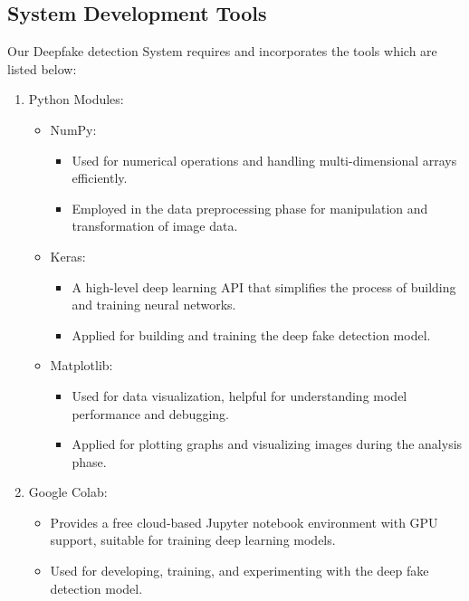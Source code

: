 \subsection{System Development Tools}
Our Deepfake detection System requires and incorporates the tools which are listed below:
\begin{enumerate}
        \item Python Modules:
        \begin{itemize}
            \item NumPy:
                \begin{itemize}
                    \item Used for numerical operations and handling multi-dimensional arrays efficiently.
                    \item Employed in the data preprocessing phase for manipulation and transformation of image data.
                \end{itemize}
            \item Keras:
                \begin{itemize}
                    \item A high-level deep learning API that simplifies the process of building and training neural networks.
                    \item Applied for building and training the deep fake detection model.
                \end{itemize}
            \item Matplotlib:
                \begin{itemize}
                    \item Used for data visualization, helpful for understanding model performance and debugging.
                    \item Applied for plotting graphs and visualizing images during the analysis phase.
                \end{itemize}
        \end{itemize}
        
        \item Google Colab:
            \begin{itemize}
                \item Provides a free cloud-based Jupyter notebook environment with GPU support, suitable for training deep learning models.
                \item Used for developing, training, and experimenting with the deep fake detection model.
            \end{itemize}
        

\end{enumerate}
